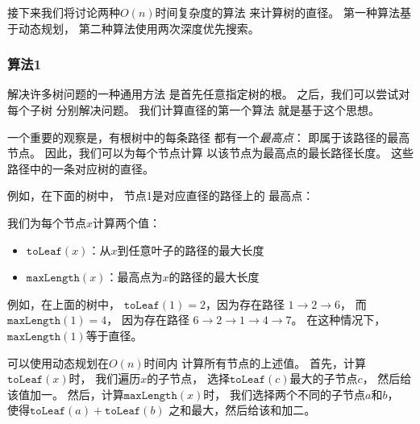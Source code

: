 接下来我们将讨论两种$O(n)$时间复杂度的算法
来计算树的直径。
第一种算法基于动态规划，
第二种算法使用两次深度优先搜索。

\subsubsection{算法1}

解决许多树问题的一种通用方法
是首先任意指定树的根。
之后，我们可以尝试对每个子树
分别解决问题。
我们计算直径的第一个算法
就是基于这个思想。

一个重要的观察是，有根树中的每条路径
都有一个\emph{最高点}：
即属于该路径的最高节点。
因此，我们可以为每个节点计算
以该节点为最高点的最长路径长度。
这些路径中的一条对应树的直径。

例如，在下面的树中，
节点1是对应直径的路径上的
最高点：
\begin{center}
\end{center}

我们为每个节点$x$计算两个值：
\begin{itemize}
\item $\texttt{toLeaf}(x)$：从$x$到任意叶子的路径的最大长度
\item $\texttt{maxLength}(x)$：最高点为$x$的路径的最大长度
\end{itemize}
例如，在上面的树中，
$\texttt{toLeaf}(1)=2$，因为存在路径
$1 \rightarrow 2 \rightarrow 6$，
而$\texttt{maxLength}(1)=4$，
因为存在路径
$6 \rightarrow 2 \rightarrow 1 \rightarrow 4 \rightarrow 7$。
在这种情况下，$\texttt{maxLength}(1)$等于直径。

可以使用动态规划在$O(n)$时间内
计算所有节点的上述值。
首先，计算$\texttt{toLeaf}(x)$时，
我们遍历$x$的子节点，
选择$\texttt{toLeaf}(c)$最大的子节点$c$，
然后给该值加一。
然后，计算$\texttt{maxLength}(x)$时，
我们选择两个不同的子节点$a$和$b$，
使得$\texttt{toLeaf}(a)+\texttt{toLeaf}(b)$
之和最大，然后给该和加二。

